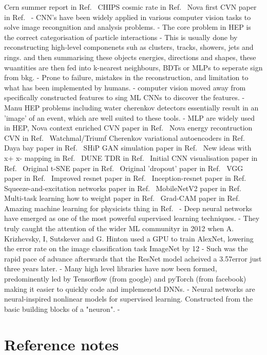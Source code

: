Cern summer report in Ref.~\cite{theodore2016}
CHIPS cosmic rate in Ref.~\cite{son2013}
Nova first CVN paper in Ref.~\cite{aurisano2016}
- CNN's have been widely applied in various computer vision tasks to solve image recongnition and analysis problems.
- The core problem in HEP is the correct categorisation of particle interactions
- This is usually done by reconstructing high-level componenets suh as clusters, tracks, showers, jets and rings. and
then summarising these objects energies, directions and shapes, these wuantities are then fed into k-nearest neighbours,
BDTs or MLPs to seperate sign from bkg.
- Prone to failure, mistakes in the reconstruction, and limitation to what has been implemented by humans.
- computer vision moved away from specifically constructed features to sing ML CNNs to discover the features.
- Manu HEP problems including water cherenkov detectors essentially result in an 'image' of an event, which are well suited to these tools.
- MLP are widely used in HEP,
Nova context enriched CVN paper in Ref.~\cite{psihas2019}
Nova energy recontruction CVN in Ref.~\cite{baldi2019}
Watchmal/Triumf Cherenkov variational autoencoders in Ref.~\cite{abhishek2019}
Daya bay paper in Ref.~\cite{racah2016}
SHiP GAN simulation paper in Ref.~\cite{ahdida2019}
New ideas with x+ x- mapping in Ref.~\cite{berns2020}
DUNE TDR in Ref.~\cite{abi2020}
Initial CNN visualisation paper in Ref.~\cite{zeiler2013}
Original t-SNE paper in Ref.~\cite{maaten2008}
Original 'dropout' paper in Ref.~\cite{hinton2012}
VGG paper in Ref.~\cite{simonyan2014}
Improved resnet paper in Ref.~\cite{he2016}
Inception-resnet paper in Ref.~\cite{szegedy2016}
Squeeze-and-excitation networks paper in Ref.~\cite{hu2017}
MobileNetV2 paper in Ref.~\cite{sandler2018}
Multi-task learning how to weight paper in Ref.~\cite{kendall2017}
Grad-CAM paper in Ref.~\cite{elvaraju2019}
Amazing machine learning for physicists thing in Ref.~\cite{mehta2019}
- Deep neural networks have emerged as one of the most powerful supervised learning techniques.
- They truly caught the attention of the wider ML communityr in 2012 when A. Krizhevsky, I, Sutskever and G. Hinton used a GPU to train
AlexNet, lowering the error rate on the image classification task ImageNet by 12%
- Such was the rapid pace of advance afterwards that the ResNet model acheived a 3.57\percent error just three years later.
- Many high level libraries have now been formed, predominently led by Tensorflow (from google) and pyTorch (from facebook) making it easier to quickly code and implemenetd DNNs.
- Neural networks are neural-inspired nonlinear models for supervised learning. Constructed from the basic building blocks of a "neuron".
-


\section{Reference notes}
